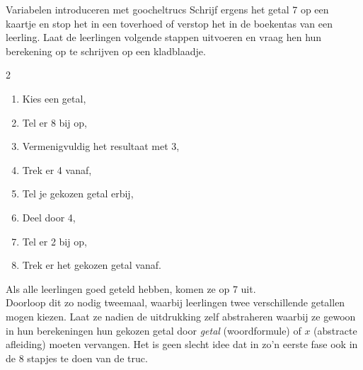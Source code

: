 \begin{lesactiviteit}{Variabelen introduceren met goocheltrucs}
Schrijf ergens het getal 7 op een kaartje en stop het in een toverhoed of verstop het in de boekentas van een leerling. Laat de leerlingen volgende stappen uitvoeren en vraag hen hun berekening op te schrijven op een kladblaadje.\begin{multicols}{2}
\setlength\itemsep{-0.5em} 
\begin{enumerate}

	
	\item Kies een getal,
	\item Tel er 8 bij op,
	\item Vermenigvuldig het resultaat met 3,
	\item Trek er 4 vanaf,
	\item Tel je gekozen getal erbij,
	\item Deel door 4,
	\item Tel er 2 bij op,
	\item Trek er het gekozen getal vanaf.
\end{enumerate}
\end{multicols} 
\noindent Als alle leerlingen goed geteld hebben, komen ze op 7 uit.\\

Doorloop dit zo nodig tweemaal, waarbij leerlingen twee verschillende getallen mogen kiezen. Laat ze nadien de uitdrukking zelf abstraheren waarbij ze gewoon in hun berekeningen hun gekozen getal door \textit{getal} (woordformule) of $x$ (abstracte afleiding) moeten vervangen. Het is geen slecht idee dat in zo'n eerste fase ook in de 8 stapjes te doen van de truc.


\end{lesactiviteit}
